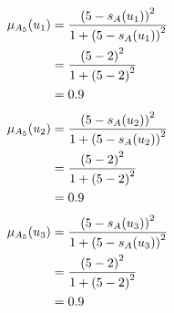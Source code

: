 \documentclass[a4paper]{book}
\begin{document}
				\begin{align}
					\mu_{A_5}(u_1) &= \frac{\left(5-s_A(u_1)\right)^2}{1 + \left(5-s_A(u_1)\right)^2}\\
					&= \frac{\left(5-2\right)^2}{1 + \left(5-2\right)^2} \notag \\
					&= 0.9 \notag
				\end{align}
				\begin{align}
					\mu_{A_5}(u_2) &= \frac{\left(5-s_A(u_2)\right)^2}{1 + \left(5-s_A(u_2)\right)^2}\\
					&= \frac{\left(5-2\right)^2}{1 + \left(5-2\right)^2} \notag \\
					&= 0.9 \notag
				\end{align}
				\begin{align}
					\mu_{A_5}(u_3) &= \frac{\left(5-s_A(u_3)\right)^2}{1 + \left(5-s_A(u_3)\right)^2}\\
					&= \frac{\left(5-2\right)^2}{1 + \left(5-2\right)^2} \notag \\
					&= 0.9 \notag
				\end{align}
\end{document}
